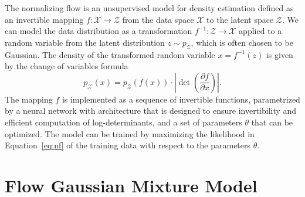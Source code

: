 \documentclass{article}
\newcommand{\mX}{\mathcal{X}}
\newcommand{\mZ}{\mathcal{Z}}
\begin{document}
The normalizing flow \citep{dinh2016density} is an unsupervised model
for density estimation defined as an invertible mapping 
$f: \mX \rightarrow \mZ$ from the data space $\mX$ to the latent space 
$\mZ$.
We can model the data distribution as a transformation 
$f^{-1}: \mZ \rightarrow \mX$ applied to a random 
variable from the latent distribution $z \sim p_\mZ$, which is often chosen to be Gaussian.
The density of the transformed random variable $x = f^{-1}(z)$ is 
given by the change of variables formula
\begin{equation}\label{eq:nf}
    p_\mX(x) = p_\mZ(f(x)) \cdot \left| \det \left( \frac {\partial f}{\partial x} \right) \right|.
\end{equation}
The mapping $f$ is implemented as a sequence of invertible functions, parametrized by a neural network with architecture
that is  designed to ensure invertibility and efficient computation 
of log-determinants, and a set of parameters $\theta$ that can be optimized. The model can be trained by maximizing the likelihood in Equation~\eqref{eq:nf} of the training
data with respect to the parameters $\theta$.

\section{Flow Gaussian Mixture Model}
\label{sec:sslnf}
\end{document}
